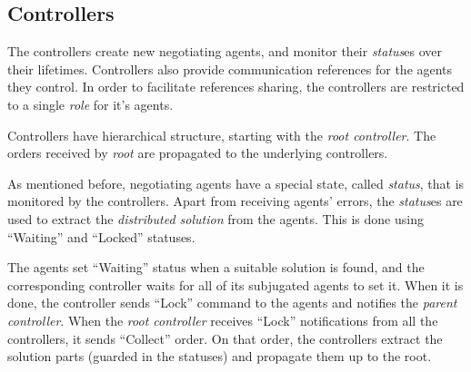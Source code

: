 %
%
%
%






\subsection{Controllers}

The controllers create new negotiating agents, and monitor their \emph{status}es
over their lifetimes. Controllers also provide communication references for the
agents they control. In order to facilitate references sharing, the controllers
are restricted to a single \emph{role} for it's agents.

Controllers have hierarchical structure, starting with the \emph{root
  controller}. The orders received by \emph{root} are propagated to
the underlying controllers.

\medskip

As mentioned before, negotiating agents have a special state,
called \emph{status}, that is monitored by the controllers. Apart
from receiving agents' errors, the \emph{status}es are used to
extract the \emph{distributed solution} from the agents.
This is done using ``Waiting'' and ``Locked'' statuses.

The agents set ``Waiting'' status when a suitable solution is found,
and the corresponding controller waits for all of its subjugated
agents to set it. When it is done, the controller sends ``Lock''
command to the agents and notifies the \emph{parent controller}.
When the \emph{root controller} receives ``Lock'' notifications from
all the controllers, it sends ``Collect'' order. On that order, the controllers
extract the solution parts (guarded in the statuses) and propagate them up to
the root.
